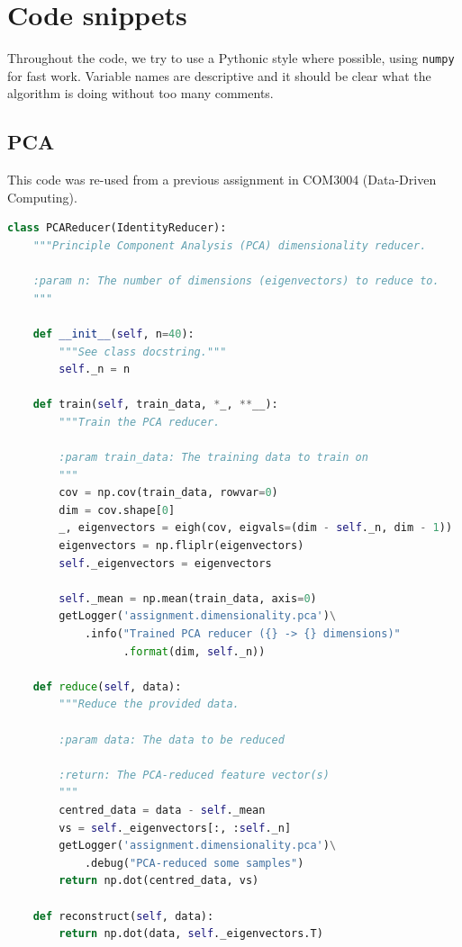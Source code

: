 \documentclass[a4paper, 11pt, twocolumn, draft]{article} %
\begin{document}
\appendix \section{Code snippets} \label{sec:code} Throughout the code, we try
to use a Pythonic style where possible, using \texttt{numpy} for fast work.
Variable names are descriptive and it should be clear what the algorithm is
doing without too many comments.

\subsection{PCA} This code was re-used from a previous assignment in COM3004
(Data-Driven Computing).

\begin{lstlisting}[language=Python, style=python]
class PCAReducer(IdentityReducer):
    """Principle Component Analysis (PCA) dimensionality reducer.

    :param n: The number of dimensions (eigenvectors) to reduce to.
    """

    def __init__(self, n=40):
        """See class docstring."""
        self._n = n

    def train(self, train_data, *_, **__):
        """Train the PCA reducer.

        :param train_data: The training data to train on
        """
        cov = np.cov(train_data, rowvar=0)
        dim = cov.shape[0]
        _, eigenvectors = eigh(cov, eigvals=(dim - self._n, dim - 1))
        eigenvectors = np.fliplr(eigenvectors)
        self._eigenvectors = eigenvectors

        self._mean = np.mean(train_data, axis=0)
        getLogger('assignment.dimensionality.pca')\
            .info("Trained PCA reducer ({} -> {} dimensions)"
                  .format(dim, self._n))

    def reduce(self, data):
        """Reduce the provided data.

        :param data: The data to be reduced

        :return: The PCA-reduced feature vector(s)
        """
        centred_data = data - self._mean
        vs = self._eigenvectors[:, :self._n]
        getLogger('assignment.dimensionality.pca')\
            .debug("PCA-reduced some samples")
        return np.dot(centred_data, vs)

    def reconstruct(self, data):
        return np.dot(data, self._eigenvectors.T)
\end{lstlisting}
\end{document}
